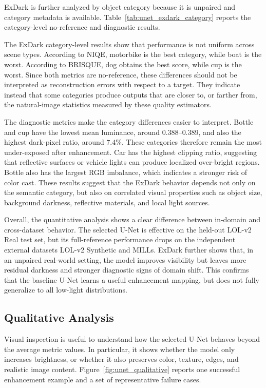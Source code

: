 ExDark is further analyzed by object category because it is unpaired and category metadata is available. Table~\ref{tab:unet_exdark_category} reports the category-level no-reference and diagnostic results.



The ExDark category-level results show that performance is not uniform across scene types. According to NIQE, motorbike is the best category, while boat is the worst. According to BRISQUE, dog obtains the best score, while cup is the worst. Since both metrics are no-reference, these differences should not be interpreted as reconstruction errors with respect to a target. They indicate instead that some categories produce outputs that are closer to, or farther from, the natural-image statistics measured by these quality estimators.

The diagnostic metrics make the category differences easier to interpret. Bottle and cup have the lowest mean luminance, around $0.388$--$0.389$, and also the highest dark-pixel ratio, around $7.4\%$. These categories therefore remain the most under-exposed after enhancement. Car has the highest clipping ratio, suggesting that reflective surfaces or vehicle lights can produce localized over-bright regions. Bottle also has the largest RGB imbalance, which indicates a stronger risk of color cast. These results suggest that the ExDark behavior depends not only on the semantic category, but also on correlated visual properties such as object size, background darkness, reflective materials, and local light sources.

Overall, the quantitative analysis shows a clear difference between in-domain and cross-dataset behavior. The selected U-Net is effective on the held-out LOL-v2 Real test set, but its full-reference performance drops on the independent external datasets LOL-v2 Synthetic and MILLs. ExDark further shows that, in an unpaired real-world setting, the model improves visibility but leaves more residual darkness and stronger diagnostic signs of domain shift. This confirms that the baseline U-Net learns a useful enhancement mapping, but does not fully generalize to all low-light distributions.

\subsection{Qualitative Analysis}

Visual inspection is useful to understand how the selected U-Net behaves beyond the average metric values. In particular, it shows whether the model only increases brightness, or whether it also preserves color, texture, edges, and realistic image content. Figure~\ref{fig:unet_qualitative} reports one successful enhancement example and a set of representative failure cases.

